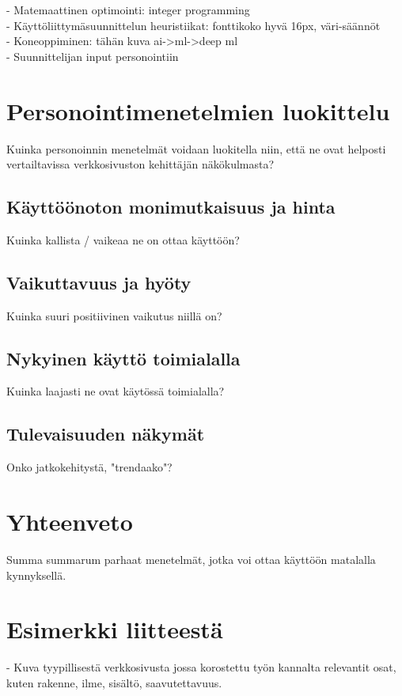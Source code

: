 \documentclass[finnish, 12pt, a4paper, elec, utf8, a-1b, online]{aaltothesis}
\begin{document}
- Matemaattinen optimointi: integer programming
\\
- Käyttöliittymäsuunnittelun heuristiikat: fonttikoko hyvä 16px, väri-säännöt
\\
- Koneoppiminen: tähän kuva ai->ml->deep ml
\\
- Suunnittelijan input personointiin

\clearpage

\section{Personointimenetelmien luokittelu}

Kuinka personoinnin menetelmät voidaan luokitella niin, että ne ovat helposti
vertailtavissa verkkosivuston kehittäjän näkökulmasta?

\subsection{Käyttöönoton monimutkaisuus ja hinta}

Kuinka kallista / vaikeaa ne on ottaa käyttöön?

\subsection{Vaikuttavuus ja hyöty}

Kuinka suuri positiivinen vaikutus niillä on?

\subsection{Nykyinen käyttö toimialalla}

Kuinka laajasti ne ovat käytössä toimialalla?

\subsection{Tulevaisuuden näkymät}

Onko jatkokehitystä, "trendaako"?

\clearpage

\section{Yhteenveto}

Summa summarum parhaat menetelmät, jotka voi ottaa käyttöön matalalla
kynnyksellä.

\clearpage

\thesisbibliography{}
\printbibliography{}

\clearpage
\thesisappendix{}

\section{Esimerkki liitteestä\label{LiiteA}}

- Kuva tyypillisestä verkkosivusta jossa korostettu työn kannalta relevantit
osat, kuten rakenne, ilme, sisältö, saavutettavuus.
\end{document}
